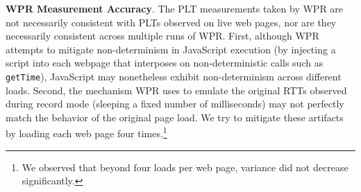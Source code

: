 \textbf{WPR Measurement Accuracy}. The PLT measurements taken by WPR are not necessarily consistent with PLTs observed on live web pages, nor are they necessarily consistent across multiple runs of WPR. First, although WPR attempts to mitigate non-determinism in JavaScript execution (by injecting a script into each webpage that interposes on non-deterministic calls such as \texttt{getTime}), JavaScript may nonetheless exhibit non-determinism across different loads. Second, the mechanism WPR uses to emulate the original RTTs observed during record mode  (sleeping a fixed number of milliseconds) may not perfectly match the behavior of the original page load.
We try to mitigate these artifacts by loading each web page four times.\footnote{We observed that beyond four loads per web page, variance did not decrease significantly.}
